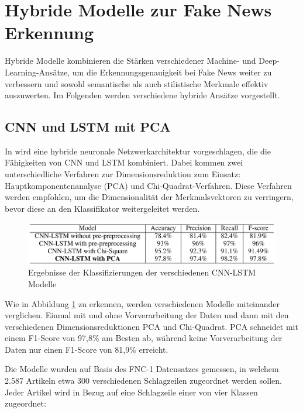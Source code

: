\section{Hybride Modelle zur Fake News Erkennung}
\label{sec:hybride_modelle}

Hybride Modelle kombinieren die Stärken verschiedener Machine- und Deep-Learning-Ansätze, um die Erkennungsgenauigkeit bei Fake News weiter 
zu verbessern und sowohl semantische als auch stilistische Merkmale effektiv auszuwerten.  
Im Folgenden werden verschiedene hybride Ansätze vorgestellt.


\subsection{CNN und LSTM mit PCA}

In \cite{umer2020} wird eine hybride neuronale Netzwerkarchitektur vorgeschlagen, die die Fähigkeiten von CNN und 
LSTM kombiniert. Dabei kommen zwei unterschiedliche Verfahren zur Dimensionsreduktion zum Einsatz: 
Hauptkomponentenanalyse (PCA) und Chi-Quadrat-Verfahren. 
Diese Verfahren werden empfohlen, um die Dimensionalität der 
Merkmalsvektoren zu verringern, bevor diese an den Klassifikator weitergeleitet werden.

\begin{figure}[htbp]
    \begin{center}
    \includegraphics[scale=0.4]{static/cnn_lstm_pca.png}
    \caption{\label{fig:cnn_lstm_pca} Ergebnisse der Klassifizierungen der verschiedenen CNN-LSTM Modelle \cite{umer2020}}
    \end{center}
\end{figure}

Wie in Abbildung \ref{fig:cnn_lstm_pca} zu erkennen, werden verschiedenen Modelle miteinander verglichen. Einmal mit und ohne Vorverarbeitung
der Daten und dann mit den verschiedenen Dimensionsreduktionen PCA und Chi-Quadrat.
PCA schneidet mit einem F1-Score von 97,8\% am Besten ab, während keine Vorverarbeitung der Daten nur einen F1-Score von 81,9\% erreicht.

Die Modelle wurden auf Basis des FNC-1 Datensatzes gemessen, in welchem 2.587 Artikeln etwa 300 verschiedenen Schlagzeilen zugeordnet werden sollen.
Jeder Artikel wird in Bezug auf eine Schlagzeile einer von vier Klassen zugeordnet:

